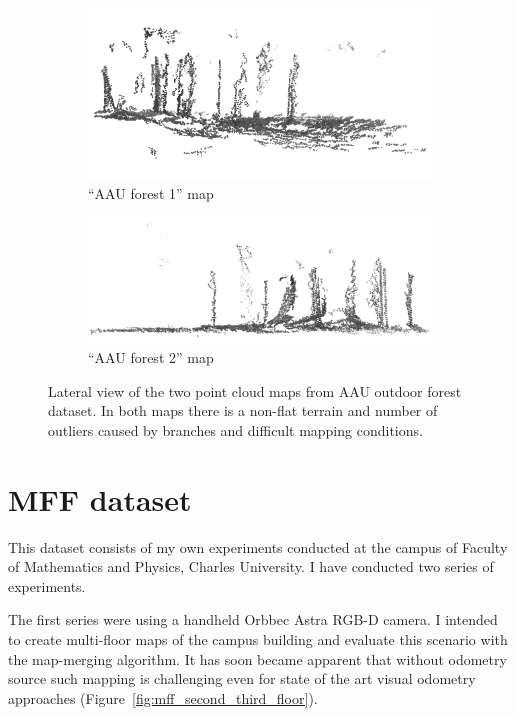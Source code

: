 \begin{figure}
    \centering
    \begin{subfigure}[b]{\textwidth}
        \includegraphics[width=\textwidth]{../img/aau_fc_dnav5_lateral.png}
        \caption{``\gls{AAU} forest 1'' map}
    \end{subfigure}
    \begin{subfigure}[b]{\textwidth}
        \includegraphics[width=\textwidth]{../img/aau_fc_dnav6_lateral.png}
        \caption{``\gls{AAU} forest 2'' map}
    \end{subfigure}
    \caption[Forest point cloud maps -- lateral view]{Lateral view of the two point cloud maps from \gls{AAU} outdoor forest dataset. In both maps there is a non-flat terrain and number of outliers caused by branches and difficult mapping conditions.}
    \label{fig:aau_lateral}
\end{figure}

\section{MFF dataset}
\label{sec:mff-dataset}

This dataset consists of my own experiments conducted at the campus of Faculty of Mathematics and Physics, Charles University. I have conducted two series of experiments.

The first series were using a handheld Orbbec Astra \gls{RGB-D} camera. I intended to create multi-floor maps of the campus building and evaluate this scenario with the map-merging algorithm. It has soon became apparent that without odometry source such mapping is challenging even for state of the art visual odometry approaches (Figure~\ref{fig:mff_second_third_floor}).

